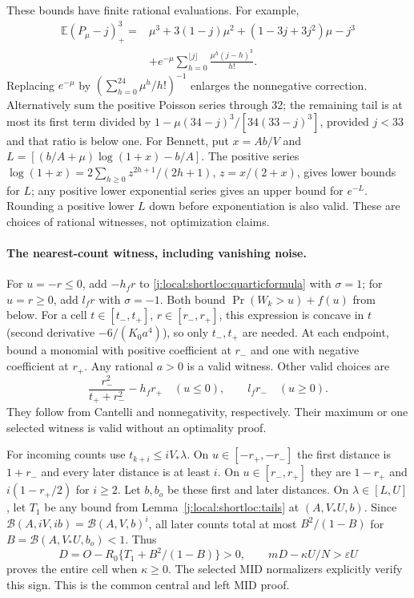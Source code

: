 These bounds have finite rational evaluations. For example,
\begin{align}\label{j:local:shortloc:poissonfinite}
 \mathbb E(P_\mu-j)_+^3={}&\mu^3+3(1-j)\mu^2+(1-3j+3j^2)\mu-j^3\\
 &+e^{-\mu}\sum_{h=0}^{\lfloor j\rfloor}\frac{\mu^h(j-h)^3}{h!}.\nonumber
\end{align}
Replacing $e^{-\mu}$ by $(\sum_{h=0}^{24}\mu^h/h!)^{-1}$ enlarges the
nonnegative correction. Alternatively sum the positive Poisson series
through 32; the remaining tail is at most its first term divided by
$1-\mu(34-j)^3/[34(33-j)^3]$, provided $j<33$ and that ratio is below one.
For Bennett, put $x=Ab/V$ and
$L=[(b/A+\mu)\log(1+x)-b/A]$. The positive series
$\log(1+x)=2\sum_{h\ge0}z^{2h+1}/(2h+1)$, $z=x/(2+x)$, gives lower
bounds for $L$; any positive lower exponential series gives an upper bound
for $e^{-L}$. Rounding a positive lower $L$ down before exponentiation is
also valid. These are choices of rational witnesses, not optimization claims.

\paragraph{The nearest-count witness, including vanishing noise.}

For $u=-r\le0$, add $-h_fr$ to \eqref{j:local:shortloc:quarticformula} with
$\sigma=1$; for $u=r\ge0$, add $l_fr$ with $\sigma=-1$.
Both bound $\Pr(W_k>u)+f(u)$ from below. For a cell
$t\in[t_-,t_+]$, $r\in[r_-,r_+]$, this expression is concave in $t$
(second derivative $-6/(K_0a^4)$), so only $t_-,t_+$ are needed.
At each endpoint, bound a monomial with positive coefficient at $r_-$
and one with negative coefficient at $r_+$. Any rational $a>0$ is a valid
witness. Other valid choices are
\begin{equation}\label{j:local:shortloc:ownother}
 \frac{r_-^2}{t_++r_-^2}-h_fr_+\quad(u\le0),\qquad l_fr_-\quad(u\ge0).
\end{equation}
They follow from Cantelli and nonnegativity, respectively. Their maximum
or one selected witness is valid without an optimality proof.

For incoming counts use $t_{k+i}\le iV_*\lambda$. On $u\in[-r_+,-r_-]$
the first distance is $1+r_-$ and every later distance is at least $i$.
On $u\in[r_-,r_+]$ they are $1-r_+$ and $i(1-r_+/2)$ for $i\ge2$.
Let $b,b_o$ be these first and later distances. On $\lambda\in[L,U]$,
let $T_1$ be any bound from Lemma~\ref{j:local:shortloc:tails} at $(A,V_*U,b)$.
Since $\mathcal B(A,iV,ib)=\mathcal B(A,V,b)^i$, all later counts total at most
$B^2/(1-B)$ for $B=\mathcal B(A,V_*U,b_o)<1$. Thus
\begin{equation}\label{j:local:shortloc:midtest}
 D=O-R_0\{T_1+B^2/(1-B)\}>0,\qquad
 mD-\kappa U/N>\varepsilon U
\end{equation}
proves the entire cell when $\kappa\ge0$. The selected MID normalizers
explicitly verify this sign. This is the common central and left MID proof.

